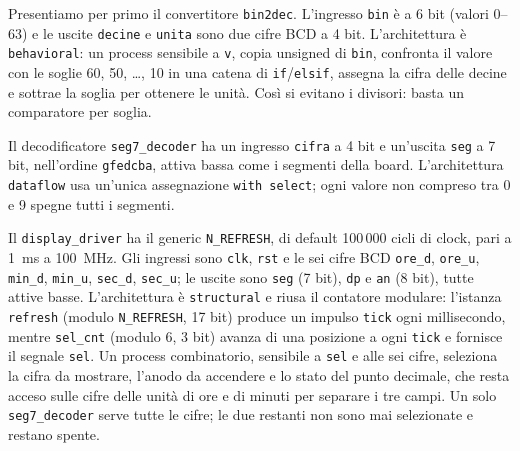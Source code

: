 \implementazione

Presentiamo per primo il convertitore \texttt{bin2dec}. L'ingresso \texttt{bin} è a 6 bit (valori 0--63) e le uscite \texttt{decine} e \texttt{unita} sono due cifre BCD a 4 bit. L'architettura è \texttt{behavioral}: un process sensibile a \texttt{v}, copia unsigned di \texttt{bin}, confronta il valore con le soglie 60, 50, \ldots, 10 in una catena di \texttt{if}/\texttt{elsif}, assegna la cifra delle decine e sottrae la soglia per ottenere le unità. Così si evitano i divisori: basta un comparatore per soglia.


Il decodificatore \texttt{seg7\_decoder} ha un ingresso \texttt{cifra} a 4 bit e un'uscita \texttt{seg} a 7 bit, nell'ordine \texttt{gfedcba}, attiva bassa come i segmenti della board. L'architettura \texttt{dataflow} usa un'unica assegnazione \texttt{with select}; ogni valore non compreso tra 0 e 9 spegne tutti i segmenti.


Il \texttt{display\_driver} ha il generic \texttt{N\_REFRESH}, di default 100\,000 cicli di clock, pari a \SI{1}{ms} a \SI{100}{MHz}. Gli ingressi sono \texttt{clk}, \texttt{rst} e le sei cifre BCD \texttt{ore\_d}, \texttt{ore\_u}, \texttt{min\_d}, \texttt{min\_u}, \texttt{sec\_d}, \texttt{sec\_u}; le uscite sono \texttt{seg} (7 bit), \texttt{dp} e \texttt{an} (8 bit), tutte attive basse. L'architettura è \texttt{structural} e riusa il contatore modulare: l'istanza \texttt{refresh} (modulo \texttt{N\_REFRESH}, 17 bit) produce un impulso \texttt{tick} ogni millisecondo, mentre \texttt{sel\_cnt} (modulo 6, 3 bit) avanza di una posizione a ogni \texttt{tick} e fornisce il segnale \texttt{sel}. Un process combinatorio, sensibile a \texttt{sel} e alle sei cifre, seleziona la cifra da mostrare, l'anodo da accendere e lo stato del punto decimale, che resta acceso sulle cifre delle unità di ore e di minuti per separare i tre campi. Un solo \texttt{seg7\_decoder} serve tutte le cifre; le due restanti non sono mai selezionate e restano spente.


